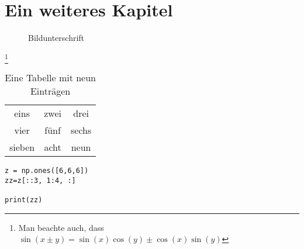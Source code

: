 
\chapter{Ein weiteres Kapitel}

\begin{figure}[h]
  \caption{Bildunterschrift}
  \label{fig:introduction}
\end{figure}

\Blindtext\footnote{Man beachte auch, dass $\sin(x\pm y) = \sin(x)\cos(y) \pm \cos(x)\sin(y)$}

\begin{table}[h]
  \centering
  \begin{tabular}{ccc}
  \toprule
  eins & zwei & drei\\
  vier & fünf & sechs\\
  sieben & acht & neun\\
  \bottomrule
  \end{tabular}
  \caption{Eine Tabelle mit neun Einträgen}
  \label{tab:tabelle3}
\end{table}

\begin{verbatim}
z = np.ones([6,6,6])
zz=z[::3, 1:4, :]

print(zz)
\end{verbatim}